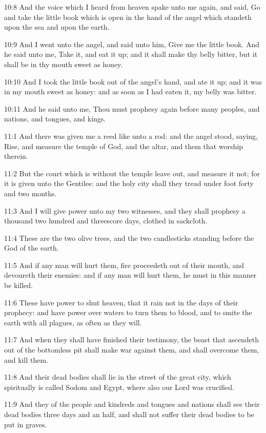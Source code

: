 10:8 And the voice which I heard from heaven spake unto me again, and
said, Go and take the little book which is open in the hand of the
angel which standeth upon the sea and upon the earth.

10:9 And I went unto the angel, and said unto him, Give me the little
book. And he said unto me, Take it, and eat it up; and it shall make
thy belly bitter, but it shall be in thy mouth sweet as honey.

10:10 And I took the little book out of the angel's hand, and ate it
up; and it was in my mouth sweet as honey: and as soon as I had eaten
it, my belly was bitter.

10:11 And he said unto me, Thou must prophesy again before many
peoples, and nations, and tongues, and kings.

11:1 And there was given me a reed like unto a rod: and the angel
stood, saying, Rise, and measure the temple of God, and the altar, and
them that worship therein.

11:2 But the court which is without the temple leave out, and measure
it not; for it is given unto the Gentiles: and the holy city shall
they tread under foot forty and two months.

11:3 And I will give power unto my two witnesses, and they shall
prophesy a thousand two hundred and threescore days, clothed in
sackcloth.

11:4 These are the two olive trees, and the two candlesticks standing
before the God of the earth.

11:5 And if any man will hurt them, fire proceedeth out of their
mouth, and devoureth their enemies: and if any man will hurt them, he
must in this manner be killed.

11:6 These have power to shut heaven, that it rain not in the days of
their prophecy: and have power over waters to turn them to blood, and
to smite the earth with all plagues, as often as they will.

11:7 And when they shall have finished their testimony, the beast that
ascendeth out of the bottomless pit shall make war against them, and
shall overcome them, and kill them.

11:8 And their dead bodies shall lie in the street of the great city,
which spiritually is called Sodom and Egypt, where also our Lord was
crucified.

11:9 And they of the people and kindreds and tongues and nations shall
see their dead bodies three days and an half, and shall not suffer
their dead bodies to be put in graves.

